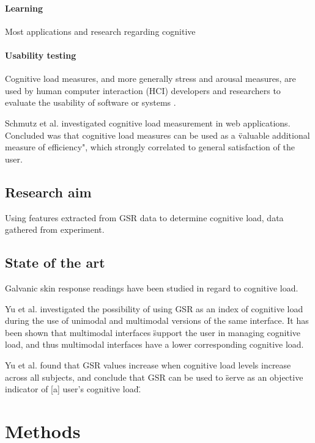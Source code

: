 \documentclass[12pt,fleqn,leqno,letterpaper]{article}
\begin{document}
\paragraph{Learning}
Most applications and research regarding cognitive 


\paragraph{Usability testing}
Cognitive load measures, and more generally stress and arousal measures, are used by human computer interaction (HCI) developers and researchers to evaluate the usability of software or systems \cite{Jacob2003} \cite{Schmutz2009}.

Schmutz et al. \cite{Schmutz2009} investigated cognitive load measurement in web applications. Concluded was that cognitive load measures can be used as a \"valuable additional measure of efficiency", which strongly correlated to general satisfaction of the user. 



\subsection{Research aim}
Using features extracted from GSR data to determine cognitive load, data gathered from experiment.

\subsection{State of the art}
Galvanic skin response readings have been studied in regard to cognitive load.

Yu et al. \cite{Yu2007} investigated the possibility of using GSR as an index of cognitive load during the use of unimodal and multimodal versions of the same interface. It has been shown that multimodal interfaces \"support the user in managing cognitive load\" \cite{Oviatt2004}, and thus multimodal interfaces have a lower corresponding cognitive load. 

Yu et al. found that GSR values increase when cognitive load levels increase across all subjects, and conclude that GSR can be used to \"serve as an objective indicator of [a] user's cognitive load\".





\section{Methods}
\end{document}
